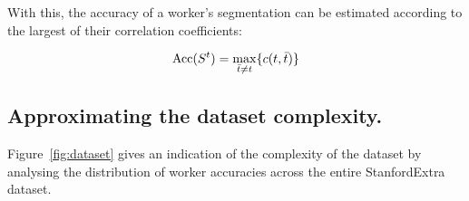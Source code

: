 With this, the accuracy of a worker's segmentation can be estimated according to the largest of their correlation coefficients: 

\begin{equation}
    \textrm{Acc}(S^{t})=\max_{\bar{t} \neq t} \{c(t, \bar{t})\}
\end{equation}

\subsection{Approximating the dataset complexity.}

Figure~\ref{fig:dataset} gives an indication of the complexity of the dataset by analysing the distribution of worker accuracies across the entire StanfordExtra dataset.




